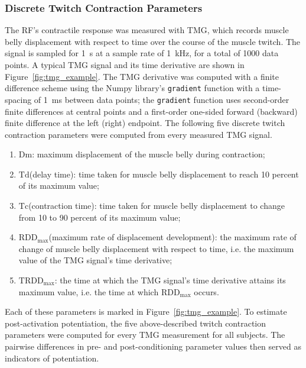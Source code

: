 \documentclass[utf8]{FrontiersinHarvard}
\newcommand{\Dm}{\ensuremath{\text{Dm}}\xspace}
\newcommand{\Td}{\ensuremath{\text{Td}}\xspace}
\newcommand{\Tc}{\ensuremath{\text{Tc}}\xspace}
\newcommand{\RDDMax}{\ensuremath{ \text{RDD}_{\text{max}}}\xspace}
\newcommand{\RDDMaxTime}{\ensuremath{ \text{TRDD}_{\text{max}}}\xspace}
\begin{document}
\subsubsection{Discrete Twitch Contraction Parameters} \label{sss:discrete_twitch_params}
The RF's contractile response was measured with TMG, which records muscle belly displacement with respect to time over the course of the muscle twitch.
The signal is sampled for \SI{1}{\second} at a sample rate of \SI{1}{\kilo \hertz}, for a total of 1000 data points.
A typical TMG signal and its time derivative are shown in Figure~\ref{fig:tmg_example}.
The TMG derivative was computed with a finite difference scheme using the Numpy library's \texttt{gradient} function with a time-spacing of \SI{1}{\milli \second} between data points;
the \texttt{gradient} function uses second-order finite differences at central points and a first-order one-sided forward (backward) finite difference at the left (right) endpoint.
The following five discrete twitch contraction parameters were computed from every measured TMG signal.
\begin{enumerate}

    \item \Dm: maximum displacement of the muscle belly during contraction;

    \item \Td (delay time): time taken for muscle belly displacement to reach 10 percent of its maximum value;

    \item \Tc (contraction time): time taken for muscle belly displacement to change from 10 to 90 percent of its maximum value;

    \item \RDDMax (maximum rate of displacement development): the maximum rate of change of muscle belly displacement with respect to time, i.e. the maximum value of the TMG signal's time derivative;

    \item \RDDMaxTime: the time at which the TMG signal's time derivative attains its maximum value, i.e. the time at which \RDDMax occurs.

\end{enumerate}
Each of these parameters is marked in Figure~\ref{fig:tmg_example}.
To estimate post-activation potentiation, the five above-described twitch contraction parameters were computed for every TMG measurement for all subjects.
The pairwise differences in pre- and post-conditioning parameter values then served as indicators of potentiation.
\end{document}
